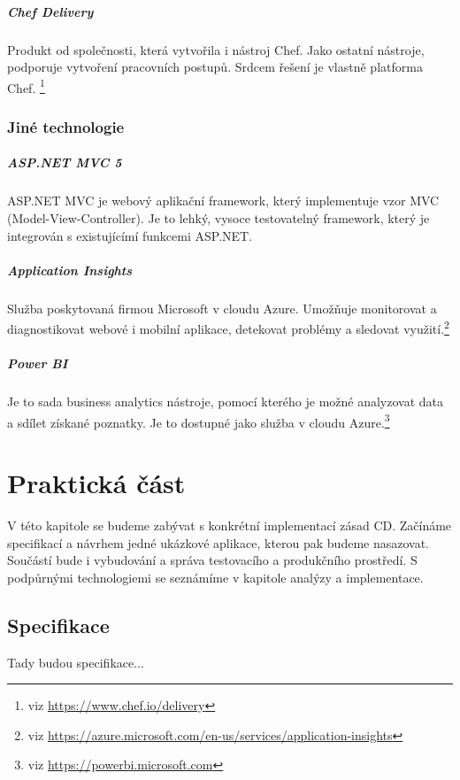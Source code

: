 \paragraph{Chef Delivery}
Produkt od společnosti, která vytvořila i nástroj Chef. Jako ostatní nástroje, podporuje vytvoření pracovních postupů. Srdcem řešení je vlastně platforma Chef. \footnote{viz \url{https://www.chef.io/delivery}}

\subsection{Jiné technologie}
\paragraph{ASP.NET MVC 5}
ASP.NET MVC je webový aplikační framework, který implementuje vzor MVC (Model-View-Controller). Je to lehký, vysoce testovatelný framework, který je integrován s existujícímí funkcemi ASP.NET. \cite{aspnetmvc}

\paragraph{Application Insights}
Služba poskytovaná firmou Microsoft v cloudu Azure. Umožňuje monitorovat a diagnostikovat webové i mobilní aplikace, detekovat problémy a sledovat využití.\footnote{viz \url{https://azure.microsoft.com/en-us/services/application-insights}}

\paragraph{Power BI}
Je to sada business analytics nástroje, pomocí kterého je možné analyzovat data a sdílet získané poznatky. Je to dostupné jako služba v cloudu Azure.\footnote{viz \url{https://powerbi.microsoft.com}}

\chapter{Praktická část}
\label{ch:impl}
V této kapitole se budeme zabývat s konkrétní implementací zásad CD. Začínáme specifikací a návrhem jedné ukázkové aplikace, kterou pak budeme nasazovat. Součástí bude i vybudování a správa testovacího a produkčního prostředí. S podpůrnými technologiemi se seznámíme v kapitole analýzy a implementace.

\section{Specifikace}
Tady budou specifikace...

